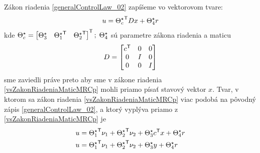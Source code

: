 \documentclass[a4paper, 10pt, ]{article}
\begin{document}
Zákon riadenia \eqref{generalControlLaw_02} zapíšeme vo vektorovom tvare:
\begin{equation} \label{vsZakonRiadeniaMaticMRCp}
	u = {\Theta_c^\star}^{\mathsf{T}} D x + \Theta_4^\star r
\end{equation}
kde $ \Theta_c^\star = \begin{bmatrix} \Theta_3^\star & {\Theta_1^\star}^{\mathsf{T}} & {\Theta_2^\star}^{\mathsf{T}} \end{bmatrix}^{\mathsf{T}}; \; \Theta_4^\star $ sú parametre zákona riadenia a maticu
\begin{align*}
	D = \begin{bmatrix} c^{\mathsf{T}} & 0 & 0 \\ 0 & I & 0 \\ 0 & 0 & I \end{bmatrix}
\end{align*}
sme zaviedli práve preto aby sme v zákone riadenia \eqref{vsZakonRiadeniaMaticMRCp} mohli priamo písať stavový vektor $x$. Tvar, v ktorom sa zákon riadenia \eqref{vsZakonRiadeniaMaticMRCp} viac podobá na pôvodný zápis \eqref{generalControlLaw_02}, a ktorý vyplýva priamo z \eqref{vsZakonRiadeniaMaticMRCp} je
\begin{subequations} \label{vsZakonRiadeniaMaticMRCp_02}
	\begin{align}
		u &= {\Theta_1^\star}^{\mathsf{T}} \nu_1 + {\Theta_2^\star}^{\mathsf{T}} \nu_2 + \Theta_3^\star {c}^{\mathsf{T}} x + \Theta_4^\star r \\
		u &= {\Theta_1^\star}^{\mathsf{T}} \nu_1 + {\Theta_2^\star}^{\mathsf{T}} \nu_2 + \Theta_3^\star y + \Theta_4^\star r
	\end{align}
\end{subequations}
\end{document}

